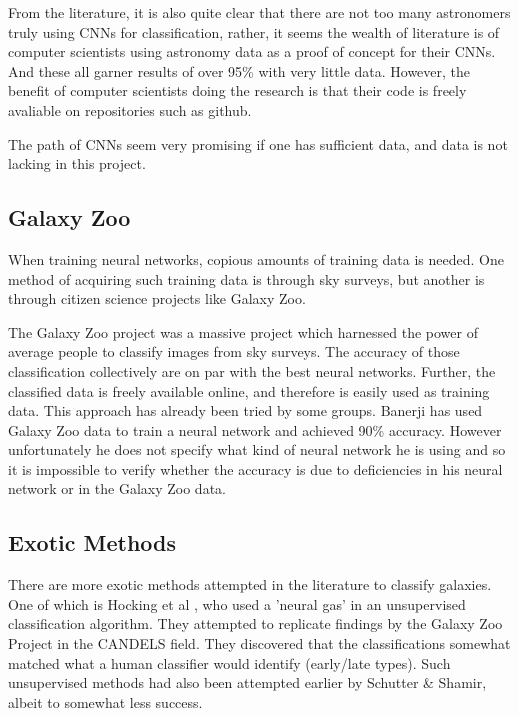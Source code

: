 \documentclass[a4paper,11pt]{article}
\begin{document}
From the literature, it is also quite clear that there are not too many astronomers truly using CNNs for classification, rather, it seems the wealth of literature is of computer scientists using astronomy data as a proof of concept for their CNNs. And these all garner results of over 95\% with very little data. However, the benefit of computer scientists doing the research is that their code is freely avaliable on repositories such as github.

The path of CNNs seem very promising if one has sufficient data, and data is not lacking in this project. 

\subsection{Galaxy Zoo}
When training neural networks, copious amounts of training data is needed. One method of acquiring such training data is through sky surveys, but another is through citizen science projects like Galaxy Zoo. \cite{lintott_2008_galaxy}

The Galaxy Zoo project was a massive project which harnessed the power of average people to classify images from sky surveys. The accuracy of those classification collectively are on par with the best neural networks. Further, the classified data is freely available online, and therefore is easily used as training data. This approach has already been tried by some groups. Banerji has used Galaxy Zoo data to train a neural network and achieved 90\% accuracy. \cite{banerji_2010_galaxy} However unfortunately he does not specify what kind of neural network he is using and so it is impossible to verify whether the accuracy is due to deficiencies in his neural network or in the Galaxy Zoo data. 

\subsection{Exotic Methods}
There are more exotic methods attempted in the literature to classify galaxies. One of which is Hocking et al \cite{hocking_2017_an} , who used a 'neural gas' in an unsupervised classification algorithm. They attempted to replicate findings by the Galaxy Zoo Project in the CANDELS field. They discovered that the classifications somewhat matched what a human classifier would identify (early/late types). Such unsupervised methods had also been attempted earlier by Schutter \& Shamir, \cite{banerji_2010_galaxy} albeit to somewhat less success. 
\end{document}
